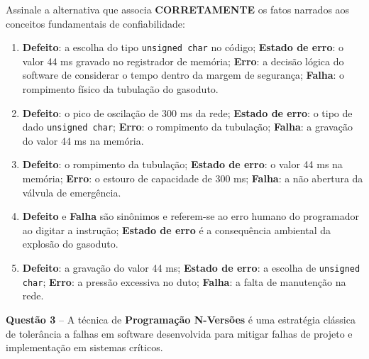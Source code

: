 \documentclass[12pt,a4paper]{article}
\begin{document}
\vspace{0.2cm}

Assinale a alternativa que associa \textbf{CORRETAMENTE} os fatos narrados aos conceitos fundamentais de confiabilidade:

\vspace{0.3cm}

\begin{enumerate}[label=\textbf{(\Alph*)}]
    \item \textbf{Defeito}: a escolha do tipo \texttt{unsigned char} no código; \textbf{Estado de erro}: o valor 44 ms gravado no registrador de memória; \textbf{Erro}: a decisão lógica do software de considerar o tempo dentro da margem de segurança; \textbf{Falha}: o rompimento físico da tubulação do gasoduto.
    
    \item \textbf{Defeito}: o pico de oscilação de 300 ms da rede; \textbf{Estado de erro}: o tipo de dado \texttt{unsigned char}; \textbf{Erro}: o rompimento da tubulação; \textbf{Falha}: a gravação do valor 44 ms na memória.
    
    \item \textbf{Defeito}: o rompimento da tubulação; \textbf{Estado de erro}: o valor 44 ms na memória; \textbf{Erro}: o estouro de capacidade de 300 ms; \textbf{Falha}: a não abertura da válvula de emergência.
    
    \item \textbf{Defeito} e \textbf{Falha} são sinônimos e referem-se ao erro humano do programador ao digitar a instrução; \textbf{Estado de erro} é a consequência ambiental da explosão do gasoduto.
    
    \item \textbf{Defeito}: a gravação do valor 44 ms; \textbf{Estado de erro}: a escolha de \texttt{unsigned char}; \textbf{Erro}: a pressão excessiva no duto; \textbf{Falha}: a falta de manutenção na rede.
\end{enumerate}

\vspace{0.5cm}

\textbf{Questão 3} -- A técnica de \textbf{Programação N-Versões} é uma estratégia clássica de tolerância a falhas em software desenvolvida para mitigar falhas de projeto e implementação em sistemas críticos.

\vspace{0.2cm}
\end{document}
